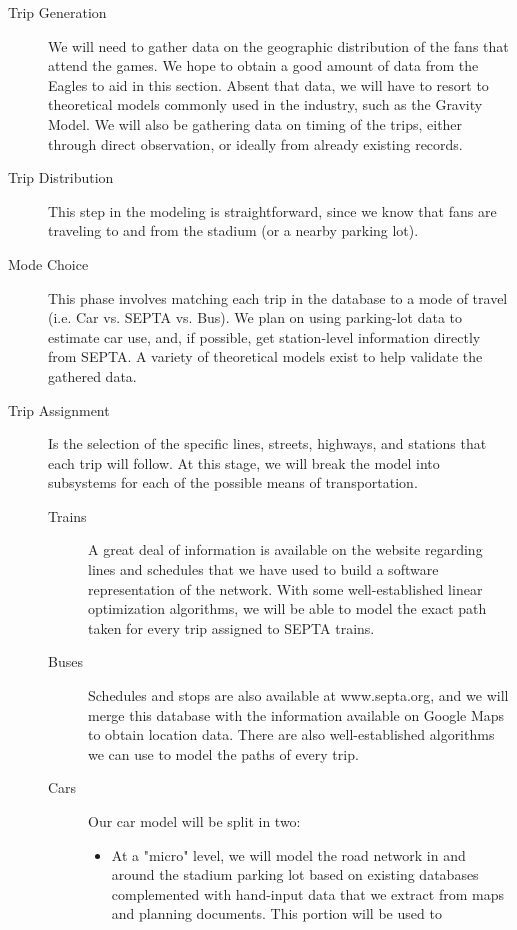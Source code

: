\documentclass[draft,12pt,titlepage]{article}
\begin{document}
\begin{description}
  \item[Trip Generation] \hfill We will need to gather data on the geographic distribution of the fans that attend the games. We hope to obtain a good amount of data from the Eagles to aid in this section. Absent that data, we will have to resort to theoretical models commonly
used in the industry, such as the Gravity Model. We will also be gathering data on
timing of the trips, either through direct observation, or ideally from already existing
records.
  \item[Trip Distribution] \hfill This step in the modeling is straightforward, since we know that fans are traveling to and from the stadium (or a nearby parking lot).
  \item[Mode Choice] \hfill This phase involves matching each trip in the database to a mode of travel (i.e. Car vs. SEPTA vs. Bus). We plan on using parking-lot data to estimate car use, and, if possible, get station-level information directly from SEPTA. A variety of theoretical models exist to help validate the gathered data. 
  \item[Trip Assignment] \hfill Is the selection of the specific lines, streets, highways, and stations that each trip will follow. At this stage, we will break the model into subsystems for each of the possible means of transportation.
    \begin{description}
      \item[Trains] \hfill A great deal of information is available on the website regarding
lines and schedules that we have used to build a software representation of the
network. With some well-established linear optimization algorithms, we will be able
to model the exact path taken for every trip assigned to SEPTA trains.
      \item[Buses] \hfill Schedules and stops are also available at www.septa.org, and we will merge
this database with the information available on Google Maps to obtain location data.
There are also well-established algorithms we can use to model the paths of every
trip.
      \item[Cars] Our car model will be split in two:
        \begin{itemize}
          \item At a "micro" level, we will model the road network in and around the stadium
parking lot based on existing databases complemented with hand-input data that
we extract from maps and planning documents. This portion will be used to

\end{itemize}
\end{description}
\end{description}
\end{document}
